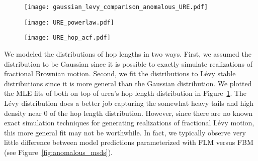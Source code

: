 \documentclass[journal=ancac3,manuscript=article,layout=twocolumn]{achemso}
\begin{document}
  \begin{figure*}
  \centering
  \begin{subfigure}{0.325\textwidth}
  \texttt{[image: gaussian\_levy\_comparison\_anomalous\_URE.pdf]}
  \caption{}\label{fig:hop_distribution_comparison}
  \end{subfigure}
  \begin{subfigure}{0.325\textwidth}
  \texttt{[image: URE\_powerlaw.pdf]}
  \caption{}\label{fig:powerlaw}
  \end{subfigure}
  \begin{subfigure}{0.325\textwidth}
  \texttt{[image: URE\_hop\_acf.pdf]}
  \caption{}\label{fig:hop_acf}
  \end{subfigure}
  \caption{Using urea as an example, (a) the distribution of hop lengths can be
	  fit by a Gaussian in addition to a more general L\'evy stable
	  distribution, though the L\'evy stable distribution does a better job of
	  capturing the heavier tails and increased density near 0. We explore
	  models fit to both distributions, as Gaussian hops are more convenient
	  to model. (b) The distribution of dwell times is fit well by a power
	  law but it over-estimates the probability density at long dwell
	  times. A power law truncated with an exponential cut-off better
	  describes the probability of long dwell times in our simulations. (c)
	  The hops are negatively correlated to their previous hop. In
	  combination, (a) -- (c) support modeling solutes as either
	  subordinated fractional Brownian or L\'evy motion. All other solutes
	  show similar distributions and autocorrelation functions (see
	  Figure~\ref{fig:anticorrelated_hops} of the Supporting Information).
  }\label{fig:anticorrelated_hops}
  \end{figure*}
  
  We modeled the distributions of hop lengths in two ways. First, we assumed
  the distribution to be Gaussian since it is possible to exactly simulate
  realizations of fractional Brownian motion. Second, we fit the distributions
  to L\'evy stable distributions since it is more general than the Gaussian
  distribution. We plotted the MLE fits of both on top of urea's hop length
  distribution in Figure~\ref{fig:hop_distribution_comparison}. The L\'evy
  distribution does a better job capturing the somewhat heavy tails and high
  density near 0 of the hop length distribution. However, since there are no
  known exact simulation techniques for generating realizations of fractional
  L\'evy motion, this more general fit may not be worthwhile. In fact, we
  typically observe very little difference between model predictions
  parameterized with FLM versus FBM (see Figure~\ref{fig:anomalous_msds}).
\end{document}
